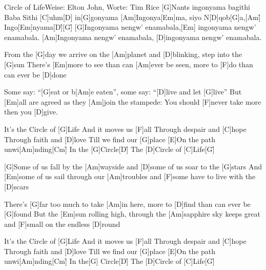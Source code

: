 \documentclass[../main.tex]{subfiles}
\begin{document}
\begin{song}[3]{Circle of Life}{Weise: Elton John, Worte: Tim Rice}{}
[G]Nants ingonyama bagithi Baba
Sithi [C]uhm[D] in[G]gonyama
[Am]Ingonya[Em]ma, siyo N[D]qob[G]a,[Am]{\h} Ingo[Em]nyama[D]{\h}[G]{\h}
[G]Ingonyama nengw' enamabala,[Em] ingonyama nengw' enamabala.
[Am]Ingonyama nengw' enamabala, [D]ingonyama nengw' enamabala.

From the [G]day we arrive on the [Am]planet and [D]blinking, step into the [G]sun
There's [Em]more to see than can [Am]ever be seen, more to [F]do than can ever be [D]done

Some say: “[G]eat or b[Am]e eaten”, some say: “[D]live and let [G]live”
But [Em]all are agreed as they [Am]join the stampede: You should [F]never take more then you [D]give.

It's the Circle of [G]Life
And it moves us [F]all
Through despair and [C]hope
Through faith and [D]love
Till we find our [G]place
[E]On the path unwi[Am]nding[Cm]{\h}
In the [G]Circle[D]{\h}
The [D]Circle of [C]Life[G]{\h}

[G]Some of us fall by the [Am]wayside and [D]some of us soar to the [G]stars
And [Em]some of us sail through our [Am]troubles and [F]some have to live with the [D]scars

There’s [G]far too much to take [Am]in here, more to [D]find than can ever be [G]found
But the [Em]sun rolling high, through the [Am]sapphire sky keeps great and [F]small on the endless [D]round

It's the Circle of [G]Life
And it moves us [F]all
Through despair and [C]hope
Through faith and [D]love
Till we find our [G]place
[E]On the path unwi[Am]nding[Cm]{\h}
In the[G] Circle[D]{\h}
The [D]Circle of [C]Life[G]{\h}
\end{song}
\end{document}
